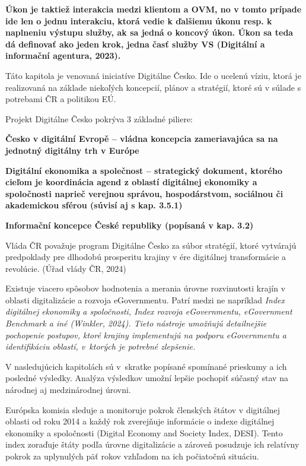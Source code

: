 \start \bf Úkon \stop je taktiež interakcia medzi klientom a OVM, no v tomto prípade ide len o jednu interakciu, ktorá vedie k ďalšiemu úkonu resp. k naplneniu výstupu služby, ak sa jedná o koncový úkon. Úkon sa teda dá definovať ako jeden krok, jedna časť služby VS \scr(Digitální a informační agentura, 2023).



Táto kapitola je venovaná iniciatíve Digitálne Česko. Ide o ucelenú víziu, ktorá je realizovaná na základe niekoľých koncepcií, plánov a stratégií, ktoré sú v súlade s potrebami ČR a politikou EÚ.

Projekt Digitálne Česko pokrýva 3 základné piliere:
\startitemize
\item{\start \bf Česko v digitální Evropě \stop -- vládna koncepcia zameriavajúca sa na jednotný digitálny trh v Európe} 
\item{\start \bf Digitální ekonomika a společnost \stop -- strategický dokument, ktorého cieľom je koordinácia agend z oblastí digitálnej ekonomiky a spoločnosti naprieč verejnou správou, hospodárstvom, sociálnou či akademickou sférou (súvisí aj s kap. 3.5.1)}
\item{\start \bf Informační koncepce České republiky \stop (popísaná v kap. 3.2)}
\stopitemize

Vláda ČR považuje program Digitálne Česko za súbor stratégií, ktoré vytvárajú predpoklady pre dlhodobú prosperitu krajiny v ére digitálnej transformácie a revolúcie. (Úřad vlády ČR, 2024)


Existuje viacero spôsobov hodnotenia a merania úrovne rozvinutosti krajín v oblasti digitalizácie a rozvoja eGovernmentu. Patrí medzi ne napríklad \start \it Index digitálnej ekonomiky a spoločnosti, Index rozvoja eGovernmentu, eGovernment Benchmark \stop a iné \scr(Winkler, 2024). Tieto nástroje umožňujú detailnejšie pochopenie postupov, ktoré krajiny implementujú na podporu eGovernmentu a identifikáciu oblastí, v~ktorých je potrebné zlepšenie.

V nasledujúcich kapitolách sú v~skratke popísané spomínané prieskumy a ich posledné výsledky. Analýza výsledkov umožní lepšie pochopiť súčasný stav na národnej aj medzinárodnej úrovni.

Európska komisia sleduje a monitoruje pokrok členských štátov v digitálnej oblasti od roku 2014 a každý rok zverejňuje informácie o indexe digitálnej ekonomiky a spoločnosti (Digital Economy and Society Index, DESI). Tento index zoraďuje štáty podľa úrovne digitalizácie a zároveň posudzuje ich relatívny pokrok za uplynulých päť rokov vzhľadom na ich počiatočnú situáciu.

